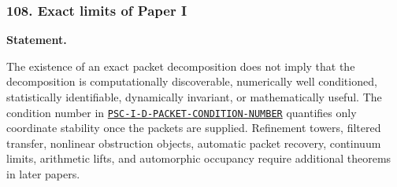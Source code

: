 \subsubsection*{108. Exact limits of Paper I}
\label{rec:PSC-I-B-FINAL-CLAIM-BOUNDARY}
\textbf{Statement.}\par
The existence of an exact packet decomposition does not imply that the decomposition is computationally discoverable, numerically well conditioned, statistically identifiable, dynamically invariant, or mathematically useful.  The condition number in \hyperref[rec:PSC-I-D-PACKET-CONDITION-NUMBER]{\nolinkurl{PSC-I-D-PACKET-CONDITION-NUMBER}} quantifies only coordinate stability once the packets are supplied.  Refinement towers, filtered transfer, nonlinear obstruction objects, automatic packet recovery, continuum limits, arithmetic lifts, and automorphic occupancy require additional theorems in later papers.
